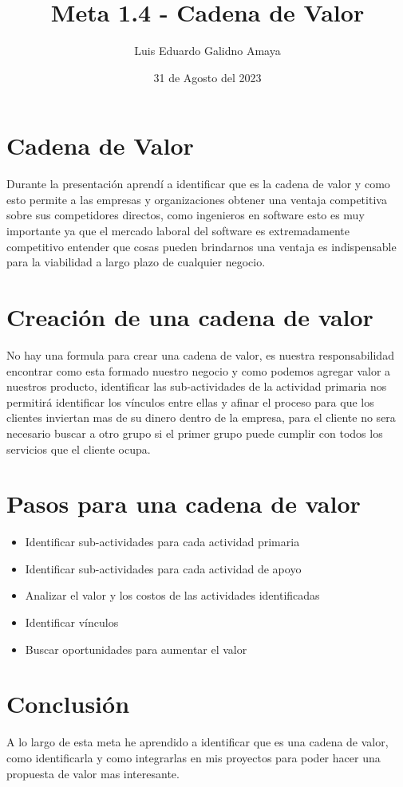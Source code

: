 \documentclass[11pt]{article}
\author{Luis Eduardo Galidno Amaya}
\date{31 de Agosto del 2023}
\title{Meta 1.4 - Cadena de Valor}
\begin{document}

\section{Cadena de Valor}
\label{sec:org7711ad9}
Durante la presentación aprendí a identificar que es la cadena de valor y como
esto permite a las empresas y organizaciones obtener una ventaja competitiva 
sobre sus competidores directos, como ingenieros en software esto es muy 
importante ya que el mercado laboral del software es extremadamente competitivo
entender que cosas pueden brindarnos una ventaja es indispensable para la 
viabilidad a largo plazo de cualquier negocio. 

\section{Creación de una cadena de valor}
\label{sec:org49d6521}
No hay una formula para crear una cadena de valor, es nuestra responsabilidad
encontrar como esta formado nuestro negocio y como podemos agregar valor
a nuestros producto, identificar las sub-actividades de la actividad primaria
nos permitirá identificar los vínculos entre ellas y afinar el proceso
para que los clientes inviertan mas de su dinero dentro de la empresa, para
el cliente no sera necesario buscar a otro grupo si el primer grupo puede 
cumplir con todos los servicios que el cliente ocupa.

\section{Pasos para una cadena de valor}
\label{sec:org3cd9063}
\begin{itemize}
\item Identificar sub-actividades para cada actividad primaria
\item Identificar sub-actividades para cada actividad de apoyo
\item Analizar el valor y los costos de las actividades identificadas
\item Identificar vínculos
\item Buscar oportunidades para aumentar el valor
\end{itemize}

\section{Conclusión}
\label{sec:org3768702}
A lo largo de esta meta he aprendido a identificar que es una cadena de valor,
como identificarla y como integrarlas en mis proyectos para poder hacer 
una propuesta de valor mas interesante.
\end{document}
